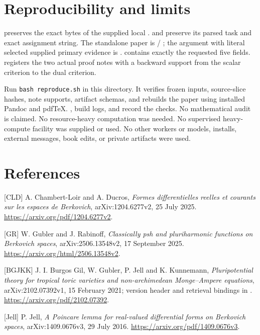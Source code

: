 \documentclass[
  11pt,
]{article}
\begin{document}
\section{Reproducibility and limits}\label{reproducibility-and-limits}

 preserves the exact bytes of the supplied
local .  and
 preserve its parsed task and exact
assignment string. The standalone paper is  /
; the argument with literal selected supplied
primary evidence is . 
contains exactly the requested five fields.  registers
the two actual proof notes with a backward support from the scalar
criterion to the dual criterion.

Run \texttt{bash\ reproduce.sh} in this directory. It verifies frozen
inputs, source-slice hashes, note supports, artifact schemas, and
rebuilds the paper using installed Pandoc and pdfTeX.
, build logs, and 
record the checks. No mathematical audit is claimed. No resource-heavy
computation was needed. No supervised heavy-compute facility was
supplied or used. No other workers or models, installs, external
messages, book edits, or private artifacts were used.

\section{References}\label{references}

{[}CLD{]} A. Chambert-Loir and A. Ducros, \emph{Formes differentielles
reelles et courants sur les espaces de Berkovich}, arXiv:1204.6277v2, 25
July 2025. \url{https://arxiv.org/pdf/1204.6277v2}.

{[}GR{]} W. Gubler and J. Rabinoff, \emph{Classically psh and
pluriharmonic functions on Berkovich spaces}, arXiv:2506.13548v2, 17
September 2025. \url{https://arxiv.org/html/2506.13548v2}.

{[}BGJKK{]} J. I. Burgos Gil, W. Gubler, P. Jell and K. Kunnemann,
\emph{Pluripotential theory for tropical toric varieties and
non-archimedean Monge--Ampere equations}, arXiv:2102.07392v1, 15
February 2021; version header and retrieval bindings in
. \url{https://arxiv.org/pdf/2102.07392}.

{[}Jell{]} P. Jell, \emph{A Poincare lemma for real-valued differential
forms on Berkovich spaces}, arXiv:1409.0676v3, 29 July 2016.
\url{https://arxiv.org/pdf/1409.0676v3}.
\end{document}
